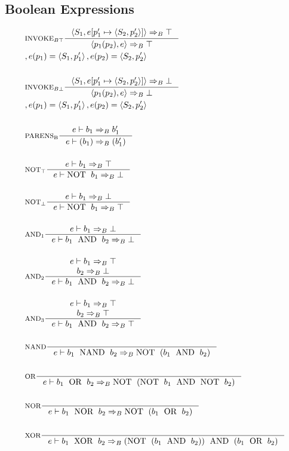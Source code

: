 \subsection{Boolean Expressions}
\newcommand{\Tand}{\text{\; AND \;}}
\newcommand{\Tnot}{\text{NOT \;}}
\newcommand{\Tnand}{\text{\; NAND \;}}
\newcommand{\Tor}{\text{\; OR \;}} 
\newcommand{\Tnor}{\text{\; NOR \;}}
\newcommand{\Txor}{\text{\; XOR \;}}

\begin{align*}
&\inference[$\text{INVOKE}_{B\top}$]{\Braket{S_1,e[p_1' \mapsto \Braket{S_2,p_2'}]} \Rightarrow_B \top}
                  {\Braket{p_1(p_2),e} \Rightarrow_B \top}
\\									
&									{,e(p_1) = \Braket{S_1,p_1'}, e(p_2) = \Braket{S_2,p_2'}}
\\\\
&\inference[$\text{INVOKE}_{B\bot}$]{\Braket{S_1,e[p_1' \mapsto \Braket{S_2,p_2'}]} \Rightarrow_B \bot}
                  {\Braket{p_1(p_2),e} \Rightarrow_B \bot}
\\									
&									{,e(p_1) = \Braket{S_1,p_1'}, e(p_2) = \Braket{S_2,p_2'}}
\\\\
&\inference[$\text{PARENS}_\text{B}$]{e \vdash b_1 \Rightarrow_B b_1'}
                       {e \vdash (b_1) \Rightarrow_B (b_1')}
\\\\
&\inference[$\text{NOT}_\top$]{e \vdash b_1 \Rightarrow_B \top}
                       {e \vdash \Tnot b_1 \Rightarrow_B \bot}
\\\\
&\inference[$\text{NOT}_\bot$]{e \vdash b_1 \Rightarrow_B \bot}
                       {e \vdash \Tnot b_1 \Rightarrow_B \top}
\\\\
&\inference[$\text{AND}_1$]{e \vdash b_1 \Rightarrow_B \bot}
                    {e \vdash b_1 \Tand b_2 \Rightarrow_B \bot}
\\\\
&\inference[$\text{AND}_2$]{e \vdash b_1 \Rightarrow_B \top \\ b_2 \Rightarrow_B \bot}
								    {e \vdash b_1 \Tand b_2 \Rightarrow_B \bot}
\\\\
&\inference[$\text{AND}_3$]{e \vdash b_1 \Rightarrow_B \top \\ b_2 \Rightarrow_B \top}
								    {e \vdash b_1 \Tand b_2 \Rightarrow_B \top}
\\\\
&\inference[NAND]{}
								   {e \vdash b_1 \Tnand b_2 \Rightarrow_B \Tnot( b_1 \Tand b_2 )}
\\\\
&\inference[OR]{}
                 {e \vdash b_1 \Tor b_2 \Rightarrow_B \Tnot(\Tnot b_1 \Tand \Tnot b_2)}
\\\\
&\inference[NOR]{}
								   {e \vdash b_1 \Tnor b_2 \Rightarrow_B \Tnot( b_1 \Tor b_2 )}
\\\\
&\inference[XOR]{}
                  {e \vdash b_1 \Txor b_2 \Rightarrow_B (\Tnot(b_1 \Tand b_2)) \Tand (b_1 \Tor b_2)}
\end{align*}

